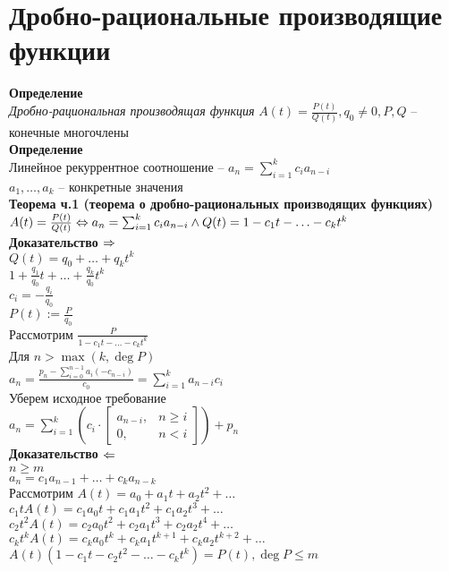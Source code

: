 \documentclass[12pt]{article}
\begin{document}
\section{Дробно-рациональные производящие функции}
\textbf{Определение}\\
\textit{Дробно-рациональная производящая функция} $A(t) = \frac{P(t)}{Q(t)}, q_0 \neq 0, P, Q$ -- конечные многочлены\\
\textbf{Определение}\\
Линейное рекуррентное соотношение -- $a_n = \sum_{i=1}^k c_ia_{n-i}$\\
$a_1, \ldots, a_k$ -- конкретные значения\\
\textbf{Теорема ч.1 (теорема о дробно-рациональных производящих функциях)}\\
$A(t) = \frac{P(t)}{Q(t)} \Leftrightarrow a_n = \sum_{i=1}^k c_ia_{n-i} \land Q(t) = 1-c_1t-\ldots - c_kt^k$\\
\textbf{Доказательство $\Rightarrow$}\\
$Q(t) = q_0 + \ldots + q_kt^k$\\
$1 + \frac{q_1}{q_0}t + \ldots + \frac{q_k}{q_0}t^k$\\
$c_i = -\frac{q_i}{q_0}$\\
$P(t) := \frac{P}{q_0}$\\
Рассмотрим $\frac{P}{1-c_1t - \ldots - c_kt^k}$\\
Для $n > \max(k, \deg P)$\\
$a_n = \frac{p_n - \sum_{i=0}^{n-1} a_i(-c_{n-i})}{c_0} = \sum_{i=1}^k a_{n-i}c_i$\\
Уберем исходное требование\\
$a_n = \sum_{i=1}^k (c_i\cdot \left[\begin{array}{cc}
    a_{n-i},& n \geq i\\
    0,& n < i
\end{array}\right]) + p_n$\\
\textbf{Доказательство $\Leftarrow$}\\
$n \geq m$\\
$a_n = c_1a_{n-1} + \ldots + c_ka_{n-k}$\\
Рассмотрим $A(t) = a_0 + a_1t + a_2t^2 + \ldots$\\
$c_1t A(t) = c_1a_0t + c_1a_1t^2 + c_1a_2t^3 + \ldots$\\
$c_2t^2 A(t) = c_2a_0t^2 + c_2a_1t^3 + c_2a_2t^4 + \ldots$\\
$c_kt^k A(t) = c_ka_0t^k + c_ka_1t^{k+1} + c_ka_2t^{k+2} + \ldots$\\
$A(t)(1-c_1t-c_2t^2 - \ldots - c_kt^k) = P(t), \deg P \leq m$\\
\end{document}
